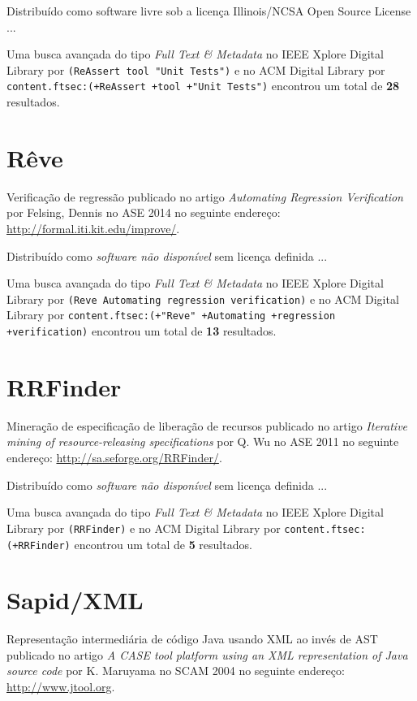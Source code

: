 Distribuído como software livre
sob a licença Illinois/NCSA Open Source License ...


Uma busca avançada do tipo {\it Full Text \& Metadata} no IEEE Xplore Digital Library por
\texttt{(ReAssert tool "Unit Tests")}
e no ACM Digital Library por
\texttt{content.ftsec:(+ReAssert +tool +"Unit Tests")}
encontrou um total de
{\bf 28}
resultados.

\section{Rêve}

Verificação de regressão
publicado no artigo
{\it Automating Regression Verification}
por
Felsing, Dennis
no
ASE
2014
no seguinte endereço:
\url{http://formal.iti.kit.edu/improve/}.

Distribuído como {\it software não disponível}
sem licença definida ...


Uma busca avançada do tipo {\it Full Text \& Metadata} no IEEE Xplore Digital Library por
\texttt{(Reve Automating regression verification)}
e no ACM Digital Library por
\texttt{content.ftsec:(+"Reve" +Automating +regression +verification)}
encontrou um total de
{\bf 13}
resultados.

\section{RRFinder}

Mineração de especificação de liberação de recursos
publicado no artigo
{\it Iterative mining of resource-releasing specifications}
por
Q. Wu
no
ASE
2011
no seguinte endereço:
\url{http://sa.seforge.org/RRFinder/}.

Distribuído como {\it software não disponível}
sem licença definida ...


Uma busca avançada do tipo {\it Full Text \& Metadata} no IEEE Xplore Digital Library por
\texttt{(RRFinder)}
e no ACM Digital Library por
\texttt{content.ftsec:(+RRFinder)}
encontrou um total de
{\bf 5}
resultados.

\section{Sapid/XML}

Representação intermediária de código Java usando XML ao invés de AST
publicado no artigo
{\it A CASE tool platform using an XML representation of Java source code}
por
K. Maruyama
no
SCAM
2004
no seguinte endereço:
\url{http://www.jtool.org}.


